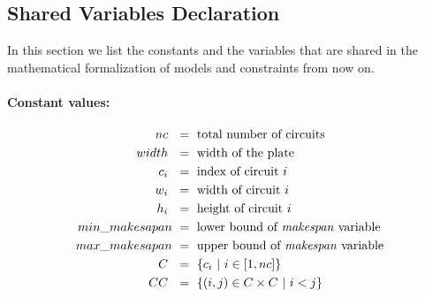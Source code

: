
\subsection{Shared Variables Declaration} \label{sec:shared_variables}
    In this section we list the constants and the variables that are shared in the mathematical formalization of 
    models and constraints from now on.

    \paragraph{Constant values:}
    \begin{align*}
        nc\             &\ =\ \text{total number of circuits}                   \\
        width\          &\ =\ \text{width of the plate}                         \\
        c_i\            &\ =\ \text{index of circuit  } i                       \\
        w_i\            &\ =\ \text{width of circuit  } i                       \\
        h_i\            &\ =\ \text{height of circuit  } i                      \\
        min\_makesapan  &\ =\ \text{lower bound of \textit{makespan} variable}  \\
        max\_makesapan  &\ =\ \text{upper bound of \textit{makespan} variable}  \\
        C\              &\ =\ \{ c_i\ |\ i \in [1, nc]\}                         \\        
        CC\             &\ =\ \{(i, j) \in C \times C\ |\ i<j \}
    \end{align*}

